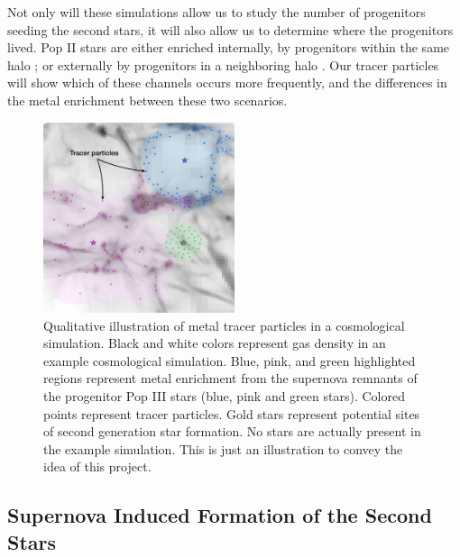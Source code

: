 \documentclass[a4paper, 12pt]{article}
\begin{document}
Not only will these simulations allow us to study the number of progenitors seeding the second stars, it will also allow us to determine where the progenitors lived. Pop II stars are either enriched internally, by progenitors within the same halo \citep{Chiaki2019}; or externally by progenitors in a neighboring halo \citep{Smith2015}. Our tracer particles will show which of these channels occurs more frequently, and the differences in the metal enrichment between these two scenarios. 


\begin{figure}
  \includegraphics[width=0.5\textwidth]{figures/tracer_final}
  \caption{Qualitative illustration of metal tracer particles in a cosmological simulation. Black and white colors represent gas density in an example cosmological simulation. Blue, pink, and green highlighted regions represent metal enrichment from the supernova remnants of the progenitor Pop III stars (blue, pink and green stars). Colored points represent tracer particles. Gold stars represent potential sites of second generation star formation. No stars are actually present in the example simulation. This is just an illustration to convey the idea of this project.}
  \label{fig:tracer}    
\end{figure}


\subsection{Supernova Induced Formation of the Second Stars}
\end{document}
